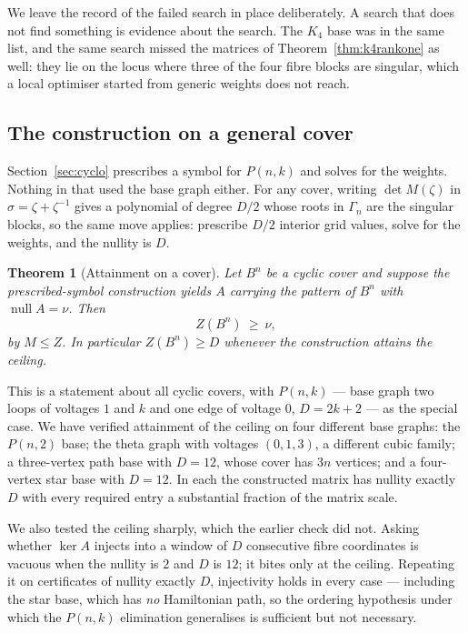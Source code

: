 \documentclass[11pt]{article}
\newtheorem{theorem}{Theorem}
\theoremstyle{definition}
\begin{document}
We leave the record of the failed search in place deliberately. A search that
does not find something is evidence about the search. The $K_4$ base was in
the same list, and the same search missed the matrices of
Theorem~\ref{thm:k4rankone} as well: they lie on the locus where three of the
four fibre blocks are singular, which a local optimiser started from generic
weights does not reach.

\subsection*{The construction on a general cover}
Section~\ref{sec:cyclo} prescribes a symbol for $P(n,k)$ and solves for the
weights. Nothing in that used the base graph either. For any cover, writing
$\det M(\zeta)$ in $\sigma=\zeta+\zeta^{-1}$ gives a polynomial of degree $D/2$
whose roots in $\Gamma_n$ are the singular blocks, so the same move applies:
prescribe $D/2$ interior grid values, solve for the weights, and the nullity is
$D$.

\begin{theorem}[Attainment on a cover]\label{thm:coverattain}
Let $B^n$ be a cyclic cover and suppose the prescribed-symbol construction
yields $A$ carrying the pattern of $B^n$ with $\operatorname{null}A=\nu$. Then
\[
  Z(B^n)\ \ge\ \nu ,
\]
by $M\le Z$. In particular $Z(B^n)\ge D$ whenever the construction attains the
ceiling.
\end{theorem}

\noindent
This is a statement about all cyclic covers, with $P(n,k)$ --- base graph two
loops of voltages $1$ and $k$ and one edge of voltage $0$, $D=2k+2$ --- as the
special case. We have verified attainment of the ceiling on four different base
graphs: the $P(n,2)$ base; the theta graph with voltages $(0,1,3)$, a different
cubic family; a three-vertex path base with $D=12$, whose cover has $3n$
vertices; and a four-vertex star base with $D=12$. In each the constructed
matrix has nullity exactly $D$ with every required entry a substantial fraction
of the matrix scale.

We also tested the ceiling sharply, which the earlier check did not. Asking
whether $\ker A$ injects into a window of $D$ consecutive fibre coordinates is
vacuous when the nullity is $2$ and $D$ is $12$; it bites only at the ceiling.
Repeating it on certificates of nullity exactly $D$, injectivity holds in every
case --- including the star base, which has \emph{no} Hamiltonian path, so the
ordering hypothesis under which the $P(n,k)$ elimination generalises is
sufficient but not necessary.
\end{document}
